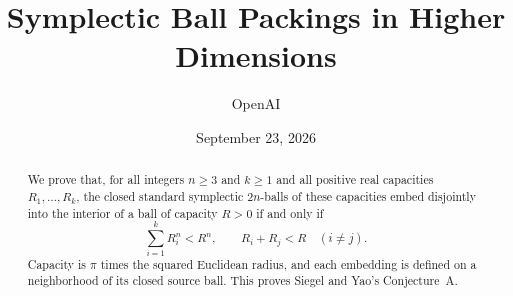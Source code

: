 \documentclass[11pt,a4paper]{article}
\title{Symplectic Ball Packings in Higher Dimensions}
\author{OpenAI}
\date{September 23, 2026}
\begin{document}
\maketitle
\begin{abstract}
We prove that, for all integers \(n\ge3\) and \(k\ge1\) and all
positive real capacities \(R_1,\ldots,R_k\), the closed standard
symplectic \(2n\)-balls of these capacities embed disjointly into the interior
of a ball of capacity \(R>0\) if and only if
\[
 \sum_{i=1}^k R_i^n<R^n,
 \qquad R_i+R_j<R\quad(i\ne j).
\]
Capacity is \(\pi\) times the squared Euclidean radius, and each
embedding is defined on a neighborhood of its closed source ball.
This proves Siegel and Yao's Conjecture~A.
\end{abstract}
\begingroup
\small
\tableofcontents
\endgroup








\end{document}
